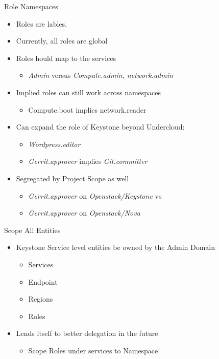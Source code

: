 \documentclass{beamer}
\begin{document}
\begin{frame}{Role Namespaces}
  \begin{itemize}
  \item Roles are lables.
  \item Currently, all roles are global
  \item Roles hould map to the services
    \begin{itemize}
    \item \textit{Admin} versus \textit{Compute.admin, network.admin}
    \end{itemize}
  \item Implied roles can still work across namespaces
    \begin{itemize}
    \item Compute.boot implies network.reader
    \end{itemize}
  \item Can expand the role of Keystone beyond Undercloud:
    \begin{itemize}
    \item \textit{Wordpress.editor}
    \item \textit{Gerrit.approver}  implies \textit{Git.committer}
    \end{itemize}
  \item Segregated by Project Scope as well
    \begin{itemize}
    \item \textit{Gerrit.approver} on \textit{Openstack/Keystone} vs
    \item \textit{Gerrit.approver} on \textit{Openstack/Nova}
    \end{itemize}
  \end{itemize}
\end{frame}


\begin{frame}{Scope All Entities}
  \begin{itemize}
  \item Keystone Service level entities be owned by the Admin Domain
    \begin{itemize}
    \item Services
    \item Endpoint
    \item Regions
    \item Roles
    \end{itemize}
  \item Lends itself to better delegation in the future
    \begin{itemize}
    \item Scope Roles under services to Namespace
    \end{itemize}
  \end{itemize}
\end{frame}
\end{document}
